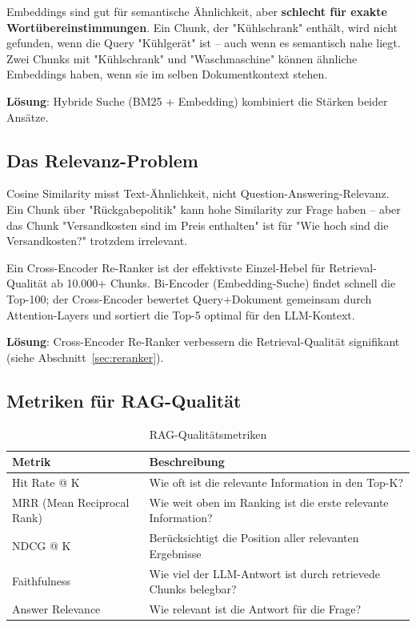 Embeddings sind gut für semantische Ähnlichkeit, aber \textbf{schlecht für exakte Wortübereinstimmungen}. Ein Chunk, der "Kühlschrank" enthält, wird nicht gefunden, wenn die Query "Kühlgerät" ist -- auch wenn es semantisch nahe liegt. Zwei Chunks mit "Kühlschrank" und "Waschmaschine" können ähnliche Embeddings haben, wenn sie im selben Dokumentkontext stehen.

\textbf{Lösung}: Hybride Suche (BM25 + Embedding) kombiniert die Stärken beider Ansätze.

\subsection{Das Relevanz-Problem}

Cosine Similarity misst Text-Ähnlichkeit, nicht Question-Answering-Relevanz. Ein Chunk über "Rückgabepolitik" kann hohe Similarity zur Frage haben -- aber das Chunk "Versandkosten sind im Preis enthalten" ist für "Wie hoch sind die Versandkosten?" trotzdem irrelevant.

\begin{praxishinweis}
Ein Cross-Encoder Re-Ranker ist der effektivste Einzel-Hebel für Retrieval-Qualität ab 10.000+ Chunks. Bi-Encoder (Embedding-Suche) findet schnell die Top-100; der Cross-Encoder bewertet Query+Dokument gemeinsam durch Attention-Layers und sortiert die Top-5 optimal für den LLM-Kontext.
\end{praxishinweis}

\textbf{Lösung}: Cross-Encoder Re-Ranker verbessern die Retrieval-Qualität signifikant (siehe Abschnitt~\ref{sec:reranker}).

\subsection{Metriken für RAG-Qualität}

\begin{table}[H]
\centering
\begin{tabularx}{\linewidth}{lX}
\toprule
\textbf{Metrik} & \textbf{Beschreibung} \\
\midrule
Hit Rate @ K & Wie oft ist die relevante Information in den Top-K? \\
MRR (Mean Reciprocal Rank) & Wie weit oben im Ranking ist die erste relevante Information? \\
NDCG @ K & Berücksichtigt die Position aller relevanten Ergebnisse \\
Faithfulness & Wie viel der LLM-Antwort ist durch retrievede Chunks belegbar? \\
Answer Relevance & Wie relevant ist die Antwort für die Frage? \\
\midrule
\end{tabularx}
\caption{RAG-Qualitätsmetriken}
\label{tab:rag-metrics}
\end{table}

